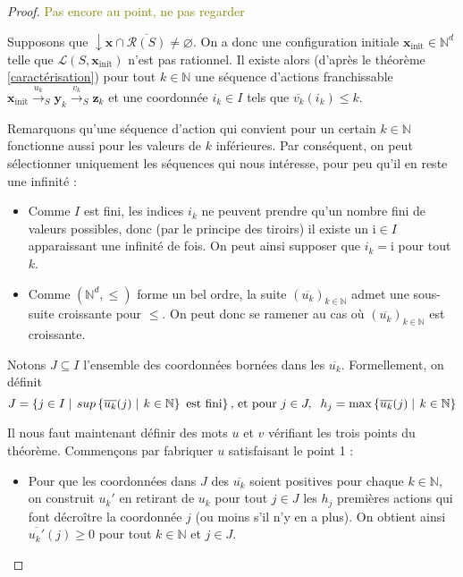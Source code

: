\documentclass[a4paper,final]{article}
\theoremstyle{definition}
\let\leq\leqslant
\let\geq\geqslant
\newcommand{\alain}[1]{\textcolor{blue}{#1}}
\newcommand{\lucas}[1]{\textcolor{olive}{#1}}
\newcommand{\set}[2]{\left\{#1\mathrel{\left|\vphantom{#1}\vphantom{#2}\right.}#2\right\}}
\let\inter\cap
\let\vide\varnothing
\newcommand{\N}{\ensuremath{\mathbb{N}}}
\newcommand{\lang}{\ensuremath{\mathcal{L}}}
\newcommand{\trans}[2]{\ensuremath{\stackrel{#1}{\longrightarrow}_{#2}}}
\newcommand{\vect}[1]{\ensuremath{\mathbf{#1}}}
\newcommand{\xinit}{\ensuremath{\vect{x}_\text{init}}}
\newcommand{\valeur}[1]{\ensuremath{\overline{#1}}}
\newcommand{\inirat}{\mathcal{R}}
\begin{document}
\begin{proof}
\lucas{Pas encore au point, ne pas regarder}

Supposons que $\downarrow \vect{x} \inter \overline{\inirat(S)} \neq \vide$.
On a donc une configuration initiale $\xinit \in \N^d$ telle que $\lang(S,\xinit)$ n'est pas rationnel.
Il existe alors (d'après le théorème \ref{caractérisation}) pour tout $k\in\N$ une séquence d'actions franchissable 
$\xinit \trans{u_k}{S} \vect{y}_k \trans{v_k}{S} \vect{z}_k$
et une coordonnée $i_k \in I$ tels que $\valeur{v_k}(i_k) \leq k$.

Remarquons qu'une séquence d'action qui convient pour un certain $k\in\N$ fonctionne aussi pour les valeurs de $k$ inférieures.
Par conséquent, on peut sélectionner uniquement les séquences qui nous intéresse, pour peu qu'il  en reste une infinité :

\begin{itemize}
    \item Comme $I$ est fini, les indices $i_k$ ne peuvent prendre qu'un nombre fini de valeurs possibles, donc (par le principe des tiroirs) il existe un $\mathrm{i}\in I$ apparaissant une infinité de fois.
    On peut ainsi supposer que $i_k = \mathrm{i}$ pour tout $k$.
    
    \item Comme $(\N^d,\leq)$ forme un bel ordre, la suite $(\valeur{u_k})_{k\in\N}$ admet une sous-suite croissante pour $\leq$.
    On peut donc se ramener au cas où $(\valeur{u_k})_{k\in\N}$ est croissante.
\end{itemize}

Notons $J\subseteq I$ l'ensemble des coordonnées bornées dans les $\valeur{u_k}$.
Formellement, on définit 
$$J = \set{j\in I}{sup \set{\valeur{u_k}(j)}{k\in\N} \text{ est fini}}
\text{, et pour } j\in J,\hspace{2mm} h_j = \max \set{\valeur{u_k}(j)}{k\in\N}$$

Il nous faut maintenant définir des mots $u$ et $v$ vérifiant les trois points du théorème.
Commençons par fabriquer $u$ satisfaisant le point 1 :
\begin{itemize}
    \item Pour que les coordonnées dans $J$ des $\valeur{u_k}$ soient positives pour chaque $k\in\N$, 
    on construit $u_k'$ en retirant de $u_k$ pour tout $j\in J$ les $h_j$ premières actions qui font décroître la coordonnée $j$ (ou moins s'il n'y en a plus).
    On obtient ainsi $\valeur{u_k'}(j) \geq 0$ pour tout $k\in\N$ et $j\in J$.
    

\end{itemize}
\end{proof}
\end{document}
